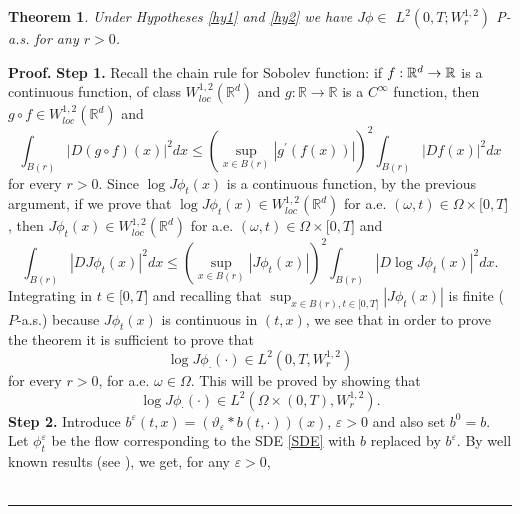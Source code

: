 \documentclass[a4paper,11pt]{article}
\newtheorem{theorem}{Theorem}
\newenvironment{proof}[1][Proof]{\textbf{#1.} }{\ \rule{0.5em}{0.5em}}
\begin{document}
\begin{theorem}
\label{iac} Under Hypotheses \ref{hy1} and \ref{hy2}  we
 have
 $J\phi \in $ $
 L^{2}(0,T;W^{1,2}_r)$ P-a.s. for any $r>0$.
\end{theorem}
\begin{proof}
\textbf{Step 1.}  %
Recall
the chain rule for Sobolev function: if $f:\mathbb{R}^{d}\rightarrow \mathbb{%
R}$ is a continuous function, of class $W_{loc}^{1,2}(\mathbb{R}^{d})$ and $%
g:\mathbb{R}\rightarrow \mathbb{R}$ is a $C^{\infty }$ function, then $%
g\circ f\in W_{loc}^{1,2}(\mathbb{R}^{d})$ and
\begin{equation*}
 \int_{B(r)}\left| D(g\circ f)(x)\right| ^{2}dx \leq \left( \sup_{x\in B(r)}\left|
g^{\prime }(f(x))\right| \right) ^{2}\int_{B(r)}\left| Df(x)\right|
^{2}dx
\end{equation*}
for every $r>0$. Since $\log J\phi _{t}(x)$ is a  continuous
function, by the previous argument, if we
prove that $\log J\phi _{t}(x)\in W_{loc}^{1,2}(\mathbb{R}^{d})$ for a.e. $%
(\omega ,t)\in \Omega \times \lbrack 0,T]$, then $J\phi _{t}(x)\in
W_{loc}^{1,2}(\mathbb{R}^{d})$ for a.e. $(\omega ,t)\in \Omega
\times \lbrack 0,T]$ and
\begin{equation*}
\int_{B(r)}\left| DJ\phi _{t}(x)\right| ^{2}dx\leq \left( \sup_{x\in
B(r)}\left| J\phi _{t}(x)\right| \right) ^{2}\int_{B(r)}\left| D\log
J\phi _{t}(x)\right| ^{2}dx.
\end{equation*}
Integrating in $t\in \lbrack 0,T]$ and recalling that $\sup_{x\in
B(r),t\in
\lbrack 0,T]}\left| J\phi _{t}(x)\right| $ is finite ($P$-a.s.) because $%
J\phi _{t}(x)$ is continuous in $(t,x)$, we see that in order to
prove the theorem it is sufficient to prove that
\begin{equation*}
\log J\phi _{\cdot }(\cdot )\in L^{2}(0,T,W_{r}^{1,2})
\end{equation*}
for every $r>0$, for a.e. $\omega \in \Omega $. This will be proved
by showing that
\begin{equation} \label{pp}
\log J\phi _{\cdot }(\cdot )\in L^{2}(\Omega \times
(0,T),W_{r}^{1,2}).
\end{equation}
\textbf{Step 2.} Introduce $b^{\varepsilon }(t,x)=(\vartheta
_{\varepsilon }\ast b(t,\cdot ))(x)$, $\varepsilon >0$  and also set
$ b^{0}=b$.
Let $\phi _{t}^{\varepsilon }$ be the flow corresponding to the SDE %
\eqref{SDE} with $b$ replaced by $b^{\varepsilon }$. By well known
results (see \cite{K}), we get, for any $\varepsilon >0$,
\begin{equation*}

\end{equation*}
\end{proof}
\end{document}
